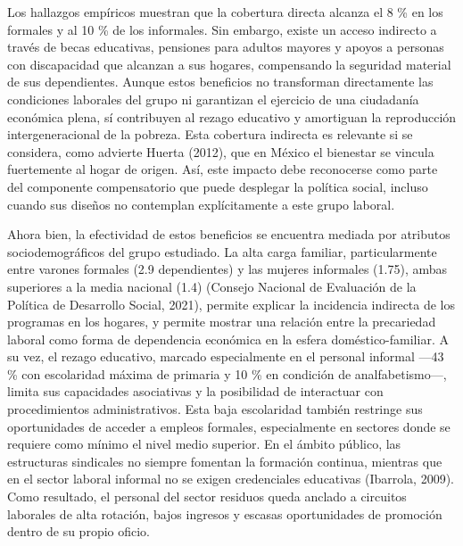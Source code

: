 \documentclass[
  spanish,
  11.5pt,
  170mm x 240mmpaper,
]{scrbook}
\begin{document}
Los hallazgos empíricos muestran que la cobertura directa alcanza el 8
\% en los formales y al 10 \% de los informales. Sin embargo, existe un
acceso indirecto a través de becas educativas, pensiones para adultos
mayores y apoyos a personas con discapacidad que alcanzan a sus hogares,
compensando la seguridad material de sus dependientes. Aunque estos
beneficios no transforman directamente las condiciones laborales del
grupo ni garantizan el ejercicio de una ciudadanía económica plena, sí
contribuyen al rezago educativo y amortiguan la reproducción
intergeneracional de la pobreza. Esta cobertura indirecta es relevante
si se considera, como advierte Huerta (2012), que en México el bienestar
se vincula fuertemente al hogar de origen. Así, este impacto debe
reconocerse como parte del componente compensatorio que puede desplegar
la política social, incluso cuando sus diseños no contemplan
explícitamente a este grupo laboral.

Ahora bien, la efectividad de estos beneficios se encuentra mediada por
atributos sociodemográficos del grupo estudiado. La alta carga familiar,
particularmente entre varones formales (2.9 dependientes) y las mujeres
informales (1.75), ambas superiores a la media nacional (1.4) (Consejo
Nacional de Evaluación de la Política de Desarrollo Social, 2021),
permite explicar la incidencia indirecta de los programas en los
hogares, y permite mostrar una relación entre la precariedad laboral
como forma de dependencia económica en la esfera doméstico-familiar. A
su vez, el rezago educativo, marcado especialmente en el personal
informal ---43 \% con escolaridad máxima de primaria y 10 \% en
condición de analfabetismo---, limita sus capacidades asociativas y la
posibilidad de interactuar con procedimientos administrativos. Esta baja
escolaridad también restringe sus oportunidades de acceder a empleos
formales, especialmente en sectores donde se requiere como mínimo el
nivel medio superior. En el ámbito público, las estructuras sindicales
no siempre fomentan la formación continua, mientras que en el sector
laboral informal no se exigen credenciales educativas (Ibarrola, 2009).
Como resultado, el personal del sector residuos queda anclado a
circuitos laborales de alta rotación, bajos ingresos y escasas
oportunidades de promoción dentro de su propio oficio.
\end{document}
